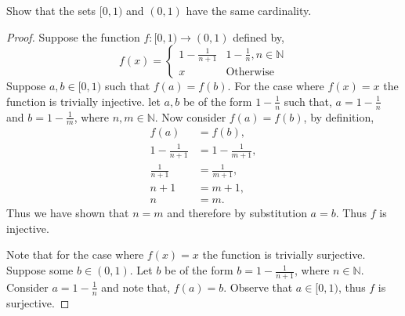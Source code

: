 \documentclass[12pt]{article}
\makeatletter
\theoremstyle{homework}
\newenvironment{exercise}[1]
{\def\@currentlabel{#1}\exercisecore}
{\endexercisecore}
\newcommand{\Nats}{\ensuremath{\mathbb N}}
\makeatother
\begin{document}
\begin{exercise}{Supplemental 2} Show that the sets $[0,1)$ and $(0,1)$ have the same cardinality.\\
  \begin{proof}
    Suppose the function $f:[0,1) \to (0,1) $ defined by,
  \[ f(x) = \begin{cases} 
    1 - \frac{1}{n+1}  & 1 - \frac{1}{n},  n \in \Nats\\
    x & \text{Otherwise} 
 \end{cases}
\]
Suppose $a,b \in [0,1)$ such that $f(a) = f(b)$. For the case where $f(x) = x$ the function is trivially injective. let $a,b$ be of the form $1 - \frac{1}{n}$ such that,
$a = 1 - \frac{1}{n}$ and $b = 1 - \frac{1}{m}$, where $n,m \in \Nats$. Now consider $f(a) = f(b)$, by definition,
\begin{align*}
  f(a) &= f(b),\\
  1 - \frac{1}{n+1} &=  1 - \frac{1}{m+1},\\
  \frac{1}{n+1} &= \frac{1}{m+1},\\
  n+1 &= m+1,\\
  n &= m.
\end{align*} 
Thus we have shown that $n = m$ and therefore by substitution $a = b$. Thus $f$ is injective.
\vspace{.25in}



Note that for the case where $f(x) = x$ the function is trivially surjective. Suppose some $b \in (0,1)$. Let $b$ be of the form $b = 1 - \frac{1}{n+1}$, where $n \in \Nats$. Consider $a = 1 - \frac{1}{n}$ and note that, $f(a) = b$. Observe that $a \in [0,1)$,
thus $f$ is surjective.
  \end{proof}
\end{exercise}
\end{document}
